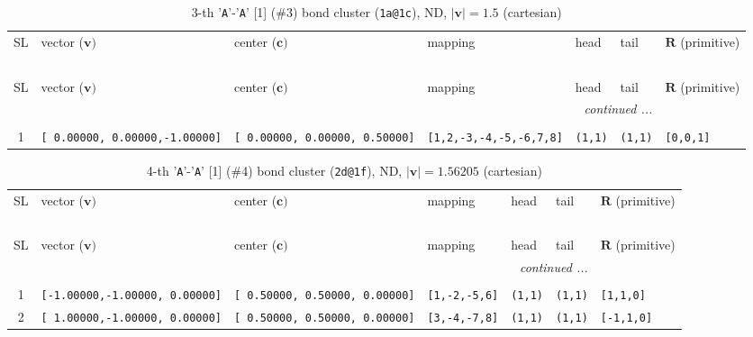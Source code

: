 \documentclass[fleqn,10pt,landscape]{jsarticle}
\begin{document}
\renewcommand{\arraystretch}{1.6}
\begin{longtable}[l]{cllllll}
\captionsetup{justification=raggedright, singlelinecheck=off}
\caption{3-th '\texttt{A}'-'\texttt{A}' [1] (\#3) bond cluster (\texttt{1a@1c}), ND, $|\bm{v}|=1.5$ (cartesian)}
 \\
 \hline \hline
SL & vector ($\bm{v})$ & center ($\bm{c})$ & mapping & head & tail & $\bm{R}$ (primitive) \\ \hline \endfirsthead

\multicolumn{6}{l}{\tablename\ \thetable{}} \\
 \hline \hline
SL & vector ($\bm{v})$ & center ($\bm{c})$ & mapping & head & tail & $\bm{R}$ (primitive) \\ \hline \endhead

 \hline \hline
\multicolumn{6}{r}{\footnotesize\it continued ...} \\ \endfoot

 \hline \hline
\multicolumn{6}{r}{} \\ \endlastfoot

1 & \texttt{[ 0.00000, 0.00000,-1.00000]} & \texttt{[ 0.00000, 0.00000, 0.50000]} & \texttt{[1,2,-3,-4,-5,-6,7,8]} & \texttt{(1,1)} & \texttt{(1,1)} & \texttt{[0,0,1]} \\
\end{longtable}
\renewcommand{\arraystretch}{1.6}
\begin{longtable}[l]{cllllll}
\captionsetup{justification=raggedright, singlelinecheck=off}
\caption{4-th '\texttt{A}'-'\texttt{A}' [1] (\#4) bond cluster (\texttt{2d@1f}), ND, $|\bm{v}|=1.56205$ (cartesian)}
 \\
 \hline \hline
SL & vector ($\bm{v})$ & center ($\bm{c})$ & mapping & head & tail & $\bm{R}$ (primitive) \\ \hline \endfirsthead

\multicolumn{6}{l}{\tablename\ \thetable{}} \\
 \hline \hline
SL & vector ($\bm{v})$ & center ($\bm{c})$ & mapping & head & tail & $\bm{R}$ (primitive) \\ \hline \endhead

 \hline \hline
\multicolumn{6}{r}{\footnotesize\it continued ...} \\ \endfoot

 \hline \hline
\multicolumn{6}{r}{} \\ \endlastfoot

1 & \texttt{[-1.00000,-1.00000, 0.00000]} & \texttt{[ 0.50000, 0.50000, 0.00000]} & \texttt{[1,-2,-5,6]} & \texttt{(1,1)} & \texttt{(1,1)} & \texttt{[1,1,0]} \\ \hline
2 & \texttt{[ 1.00000,-1.00000, 0.00000]} & \texttt{[ 0.50000, 0.50000, 0.00000]} & \texttt{[3,-4,-7,8]} & \texttt{(1,1)} & \texttt{(1,1)} & \texttt{[-1,1,0]} \\
\end{longtable}
\end{document}
